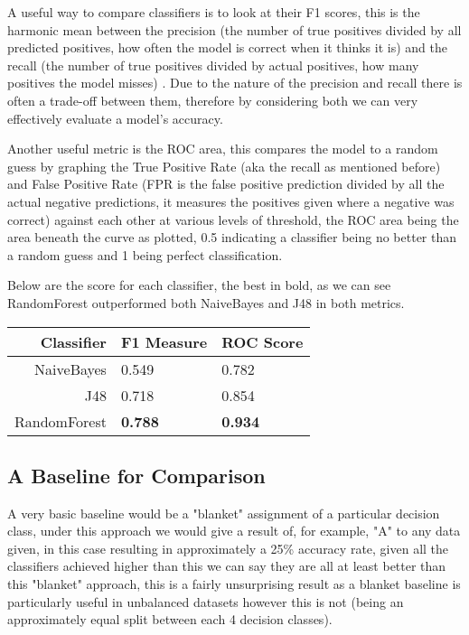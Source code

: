A useful way to compare classifiers is to look at their F1 scores, this is the harmonic mean between the precision (the number of true positives divided by all predicted positives, how often the model is correct when it thinks it is) and the recall (the number of true positives divided by actual positives, how many positives the model misses) \cite{sasaki2007}. Due to the nature of the precision and recall there is often a trade-off between them, therefore by considering both we can very effectively evaluate a model's accuracy. 

Another useful metric is the ROC area, this compares the model to a random guess by graphing the True Positive Rate (aka the recall as mentioned before) and False Positive Rate (FPR is the false positive prediction divided by all the actual negative predictions, it measures the positives given where a negative was correct) against each other at various levels of threshold, the ROC area being the area beneath the curve as plotted, 0.5 indicating a classifier being no better than a random guess and 1 being perfect classification. 

Below are the score for each classifier, the best in bold, as we can see RandomForest outperformed both NaiveBayes and J48 in both metrics.

\begin{center}
\begin{tabular}{|r|l|l|}
\hline 
Classifier & F1 Measure & ROC Score \\ 
\hline 
NaiveBayes & 0.549 & 0.782 \\ 
\hline 
J48 & 0.718 & 0.854 \\ 
\hline 
RandomForest & \textbf{0.788} & \textbf{0.934} \\ 
\hline 
\end{tabular} 
\end{center}


\subsection{A Baseline for Comparison}
A very basic baseline would be a "blanket" assignment of a particular decision class, under this approach we would give a result of, for example, "A" to any data given, in this case resulting in approximately a 25\% accuracy rate, given all the classifiers achieved higher than this we can say they are all at least better than this "blanket" approach, this is a fairly unsurprising result as a blanket baseline is particularly useful in unbalanced datasets however this is not (being an approximately equal split between each 4 decision classes).

